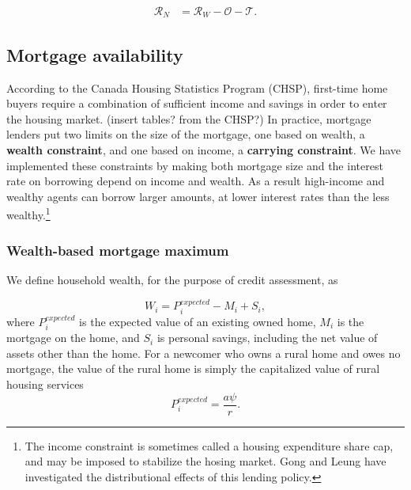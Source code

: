 \begin{align}
\mathcal{R}_N &= \mathcal{R}_W - \mathcal{O} - \mathcal{T}.
\end{align}

 {\color{black}

\subsection{Mortgage availability} \label{sec:mortgage-availability}
According to the Canada Housing Statistics Program (CHSP), first-time home buyers require a combination of sufficient income and savings in order to enter the housing market. (insert tables? from the CHSP?) In practice, mortgage lenders put two  limits on the size of the mortgage, one based on wealth, a \textbf{wealth constraint}, and one based on income, a \textbf{carrying constraint}. We have implemented these constraints by making both mortgage size and the interest rate on borrowing depend on income and wealth. As a result high-income and  wealthy agents can borrow larger amounts, at lower interest rates than the less wealthy.\footnote{The income constraint is sometimes called a housing expenditure share cap, and may be imposed to stabilize the hosing market. Gong and Leung \cite{yifangongDoesSpaceMatter2003} have investigated the distributional effects of this lending policy.}


\subsubsection{Wealth-based mortgage maximum} 
We define household wealth, for the purpose of credit assessment, as

\begin{equation} 
W_i= P^{expected}_i - M_i  +S_i, 
\end{equation}
where $P^{expected}_i$ is the expected value of an existing owned home, $M_i$ is the mortgage on the home, and $S_i$ is personal savings, including the net value of assets other than the home. %
For a newcomer who owns a rural home and owes no mortgage, the value of the rural home is simply the capitalized value of rural housing services
\begin{equation} 
P^{expected}_i = \frac{a\psi}{r}.
\end{equation}


}
